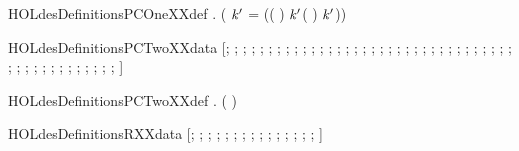 \newcommand{\HOLdesDefinitionsPCOneXXdata}{\UseVerbatim{HOLdesDefinitionsPCOneXXdata}}
\begin{SaveVerbatim}{HOLdesDefinitionsPCOneXXdef}
\HOLTokenTurnstile{} \HOLSymConst{\HOLTokenForall{}}.   \HOLSymConst{=}
       (
          \ensuremath{\HOLBoundVar{k}\sp{\prime{}}} =   
          (( \HOLSymConst{\HOLTokenExtract{}} ) \ensuremath{\HOLBoundVar{k}\sp{\prime{}}}\HOLSymConst{,}( \HOLSymConst{\HOLTokenExtract{}} ) \ensuremath{\HOLBoundVar{k}\sp{\prime{}}}))
\end{SaveVerbatim}
\newcommand{\HOLdesDefinitionsPCOneXXdef}{\UseVerbatim{HOLdesDefinitionsPCOneXXdef}}
\begin{SaveVerbatim}{HOLdesDefinitionsPCTwoXXdata}
\HOLTokenTurnstile{}  \HOLSymConst{=}
   [; ; ; ; ; ; ; ; ; ; ; ; ; ; ; ;
    ; ; ; ; ; ; ; ; ; ; ; ; ; ; ; ;
    ; ; ; ; ; ; ; ; ; ; ; ; ; ; ;
    ]
\end{SaveVerbatim}
\newcommand{\HOLdesDefinitionsPCTwoXXdata}{\UseVerbatim{HOLdesDefinitionsPCTwoXXdata}}
\begin{SaveVerbatim}{HOLdesDefinitionsPCTwoXXdef}
\HOLTokenTurnstile{} \HOLSymConst{\HOLTokenForall{}}.   \HOLSymConst{=}  (    ) 
\end{SaveVerbatim}
\newcommand{\HOLdesDefinitionsPCTwoXXdef}{\UseVerbatim{HOLdesDefinitionsPCTwoXXdef}}
\begin{SaveVerbatim}{HOLdesDefinitionsRXXdata}
\HOLTokenTurnstile{}  \HOLSymConst{=} [; ; ; ; ; ; ; ; ; ; ; ; ; ; ; ]
\end{SaveVerbatim}
